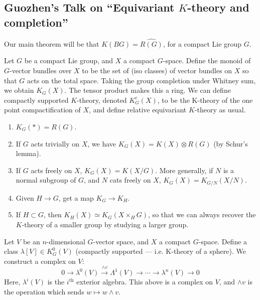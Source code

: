\documentclass[11pt]{article}
\newcommand{\KanSemResponse}[1]
{
\thispagestyle{fancy}
\subsection*{#1}
}
\begin{document}
\begin{GuozhenEqKthy}
\KanSemResponse
{Guozhen's Talk on ``Equivariant $K$-theory and completion''}
Our main theorem will be that $K(BG)=\widehat{R(G)}$, for a compact Lie group $G$.

\begin{defn*}Let $G$ be a compact Lie group, and $X$ a compact $G$-space. Define the monoid of $G$-vector bundles over $X$ to be the set of (iso classes) of vector bundles on $X$ so that $G$ acts on the total space. Taking the group completion under Whitney sum, we obtain $K_G(X)$. The tensor product makes this a ring. We can define compactly supported $K$-theory, denoted $K^c_G(X)$, to be the K-theory of the one point compactification of $X$, and define relative equivariant $K$-theory as usual.
\end{defn*}
\begin{enumerate}\squishlist
\item $K_G(*)=R(G)$. 
\item If $G$ acts trivially on $X$, we have $K_G(X)=K(X)\otimes R(G)$ (by Schur's lemma).
\item If $G$ acts freely on $X$, $K_G(X)=K(X/G)$. More generally, if $N$ is a normal subgroup of $G$, and $N$ cats freely on $X$, $K_G(X)=K_{G/N}(X/N)$.
\item Given $H\to G$, get a map $K_G\to K_H$.
\item If $H\subset G$, then $K_H(X)\simeq K_G(X\times_H G)$, so that we can always recover the $K$-theory of a smaller group by studying a larger group.
\end{enumerate}
Let $V$ be an $n$-dimensional $G$-vector space, and $X$ a compact $G$-space. Define a class $\lambda[V]\in K^0_G(V)$ (compactly supported --- i.e. K-theory of a sphere). We construct a complex on $V$:
\[0\to\lambda^0(V)\overset{\wedge v}{\to}\Lambda^1(V)\to\cdots\to \lambda^n(V)\to0\]
Here, $\lambda^i(V)$ is the $i^\text{th}$ exterior algebra. This above is a complex on $V$, and $\wedge v$ is the operation which sends $w\mapsto w\wedge v$.


\end{GuozhenEqKthy}
\end{document}
